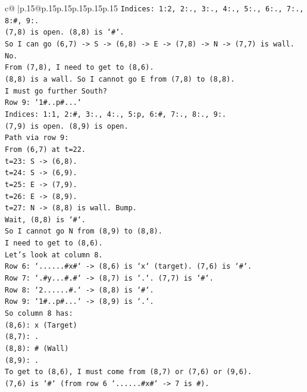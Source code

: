 \documentclass{article}
\begin{document}
{\begin{supertabular}{c@{$\;$}|p{.15\linewidth}@{}p{.15\linewidth}p{.15\linewidth}p{.15\linewidth}p{.15\linewidth}p{.15\linewidth}}
{{{\texttt{Indices: 1:2, 2:., 3:., 4:., 5:., 6:., 7:., 8:\#, 9:.} \\
\texttt{(7,8) is open. (8,8) is `\#`.} \\
\texttt{So I can go (6,7) {-}> S {-}> (6,8) {-}> E {-}> (7,8) {-}> N {-}> (7,7) is wall. No.} \\
\texttt{From (7,8), I need to get to (8,6).} \\
\texttt{(8,8) is a wall. So I cannot go E from (7,8) to (8,8).} \\
\texttt{I must go further South?} \\
\texttt{Row 9: `1\#..p\#...`} \\
\texttt{Indices: 1:1, 2:\#, 3:., 4:., 5:p, 6:\#, 7:., 8:., 9:.} \\
\texttt{(7,9) is open. (8,9) is open.} \\
\texttt{Path via row 9:} \\
\texttt{From (6,7) at t=22.} \\
\texttt{t=23: S {-}> (6,8).} \\
\texttt{t=24: S {-}> (6,9).} \\
\texttt{t=25: E {-}> (7,9).} \\
\texttt{t=26: E {-}> (8,9).} \\
\texttt{t=27: N {-}> (8,8) is wall. Bump.} \\
\texttt{Wait, (8,8) is `\#`.} \\
\texttt{So I cannot go N from (8,9) to (8,8).} \\
\texttt{I need to get to (8,6).} \\
\texttt{Let's look at column 8.} \\
\texttt{Row 6: `......\#x\#` {-}> (8,6) is `x` (target). (7,6) is `\#`.} \\
\texttt{Row 7: `.\#y...\#.\#` {-}> (8,7) is `.`. (7,7) is `\#`.} \\
\texttt{Row 8: `2......\#.` {-}> (8,8) is `\#`.} \\
\texttt{Row 9: `1\#..p\#...` {-}> (8,9) is `.`.} \\
\texttt{So column 8 has:} \\
\texttt{(8,6): x (Target)} \\
\texttt{(8,7): .} \\
\texttt{(8,8): \# (Wall)} \\
\texttt{(8,9): .} \\
\texttt{To get to (8,6), I must come from (8,7) or (7,6) or (9,6).} \\
\texttt{(7,6) is `\#` (from row 6 `......\#x\#` {-}> 7 is \#).} \\
}}}
\end{supertabular}}
\end{document}
